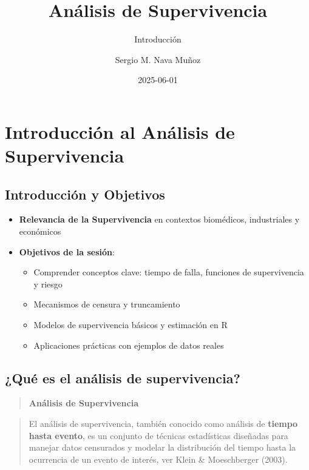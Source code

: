 \documentclass[
  letterpaper,
  DIV=11,
  numbers=noendperiod]{scrartcl}
\title{Análisis de Supervivencia}
\subtitle{Introducción}
\author{Sergio M. Nava Muñoz}
\date{2025-06-01}
\providecommand{\tightlist}{%
  \setlength{\itemsep}{0pt}\setlength{\parskip}{0pt}}
\begin{document}
\maketitle


\section{Introducción al Análisis de
Supervivencia}\label{introducciuxf3n-al-anuxe1lisis-de-supervivencia}

\subsection{Introducción y Objetivos}\label{introducciuxf3n-y-objetivos}

\begin{itemize}
\tightlist
\item
  \textbf{Relevancia de la Supervivencia} en contextos biomédicos,
  industriales y económicos
\item
  \textbf{Objetivos de la sesión}:

  \begin{itemize}
  \tightlist
  \item
    Comprender conceptos clave: tiempo de falla, funciones de
    supervivencia y riesgo
  \item
    Mecanismos de censura y truncamiento
  \item
    Modelos de supervivencia básicos y estimación en R
  \item
    Aplicaciones prácticas con ejemplos de datos reales
  \end{itemize}
\end{itemize}

\subsection{¿Qué es el análisis de
supervivencia?}\label{quuxe9-es-el-anuxe1lisis-de-supervivencia}

\begin{quote}
\textbf{Análisis de Supervivencia}\\
\end{quote}

\begin{quote}
El análisis de supervivencia, también conocido como análisis de
\textbf{tiempo hasta evento}, es un conjunto de técnicas estadísticas
diseñadas para manejar datos censurados y modelar la distribución del
tiempo hasta la ocurrencia de un evento de interés, ver Klein \&
Moeschberger (2003).
\end{quote}
\end{document}
